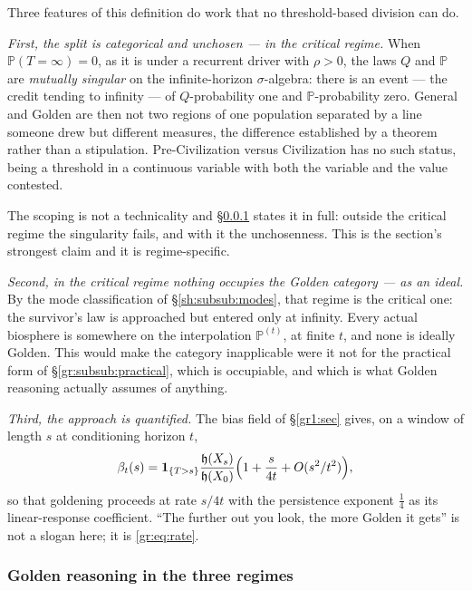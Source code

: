 \documentclass[11pt]{article}
\numberwithin{equation}{section}
\theoremstyle{plain}
\theoremstyle{definition}
\theoremstyle{remark}
\newcommand{\PP}{\mathbb{P}}
\newcommand{\one}{\mathbf{1}}
\newcommand{\hm}{\mathfrak{h}}
\begin{document}
Three features of this definition do work that no threshold-based
division can do.

\emph{First, the split is categorical and unchosen --- in the critical
regime.} When $\PP(T=\infty)=0$, as it is under a recurrent driver with
$\rho>0$, the laws $Q$ and $\PP$ are \emph{mutually singular} on the
infinite-horizon $\sigma$-algebra: there is an event --- the credit
tending to infinity --- of $Q$-probability one and $\PP$-probability
zero. General and Golden are then not two regions of one population
separated by a line someone drew but different measures, the difference
established by a theorem rather than a stipulation. Pre-Civilization
versus Civilization has no such status, being a threshold in a
continuous variable with both the variable and the value contested.

The scoping is not a technicality and \S\ref{gr:subsub:regimes} states
it in full: outside the critical regime the singularity fails, and with
it the unchosenness. This is the section's strongest claim and it is
regime-specific.

\emph{Second, in the critical regime nothing occupies the Golden
category --- as an ideal.} By the mode classification of
\S\ref{sh:subsub:modes}, that regime is the critical one: the survivor's
law is approached but entered only at infinity. Every actual biosphere is somewhere on the interpolation
$\PP^{(t)}$, at finite $t$, and none is ideally Golden. This would make
the category inapplicable were it not for the practical form of
\S\ref{gr:subsub:practical}, which is occupiable, and which is what
Golden reasoning actually assumes of anything.

\emph{Third, the approach is quantified.} The bias field of \S\ref{gr1:sec}
gives, on a window of length $s$ at conditioning horizon $t$,
\begin{equation}\label{gr:eq:rate}
\beta_t(s)=\one_{\{T>s\}}\frac{\hm(X_s)}{\hm(X_0)}
\Bigl(1+\frac{s}{4t}+O(s^{2}/t^{2})\Bigr),
\end{equation}
so that goldening proceeds at rate $s/4t$ with the persistence exponent
$\tfrac14$ as its linear-response coefficient. ``The further out you
look, the more Golden it gets'' is not a slogan here; it is
\eqref{gr:eq:rate}.

\subsubsection{Golden reasoning in the three regimes}
\label{gr:subsub:regimes}
\end{document}
